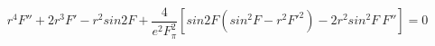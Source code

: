 \begin{equation}
r^4 F'' + 2r^3 F' -r^2 sin2F +\frac{4}{e^2 F_\pi^2} [ sin2F(sin^2F - r^2 F'^2) -2r^2 sin^2F~F'']=0
\end{equation}

